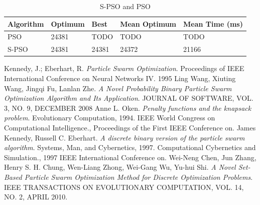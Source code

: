 \documentclass{article}
\begin{document}
\begin{table}
\begin{tabular}{|l|l|l|l|l|}
	\hline
	Algorithm & Optimum & Best & Mean Optimum & Mean Time (ms) \\
	\hline
	PSO & 24381 & TODO & TODO & TODO \\ \hline
	S-PSO & 24381 & 24381 & 24372 & 21166 \\ \hline
\end{tabular}
\caption{S-PSO and PSO}
\end{table}

\newpage

\begin{thebibliography}{99}
		Kennedy, J.; Eberhart, R.
		\emph{Particle Swarm Optimization}.
		Proceedings of IEEE International Conference on Neural Networks IV.
		1995
		Ling Wang, Xiuting Wang, Jingqi Fu, Lanlan Zhe.
	  	\emph{A Novel Probability Binary Particle Swarm Optimization Algorithm and Its Application}.
	  	JOURNAL OF SOFTWARE, VOL. 3, NO. 9, DECEMBER 2008
		Anne L. Oken.
		\emph{Penalty functions and the knapsack problem}.
		Evolutionary Computation, 1994. IEEE World Congress on Computational Intelligence., Proceedings of the First IEEE Conference on.
		James Kennedy, Russell C. Eberhart.
		\emph{A discrete binary version of the particle swarm algorithm}.
		Systems, Man, and Cybernetics, 1997. Computational Cybernetics and Simulation., 1997 IEEE International Conference on.
		Wei-Neng Chen, Jun Zhang, Henry S. H. Chung, Wen-Liang Zhong, Wei-Gang Wu, Yu-hui Shi.
		\emph{A Novel Set-Based Particle Swarm Optimization Method for Discrete Optimization Problems}.
		IEEE TRANSACTIONS ON EVOLUTIONARY COMPUTATION, VOL. 14, NO. 2, APRIL 2010.
\end{thebibliography}
\end{document}
